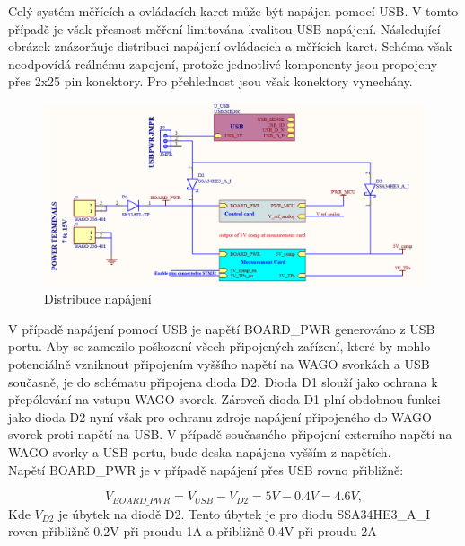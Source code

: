     Celý systém měřících a ovládacích karet může být napájen pomocí USB. V tomto případě je však přesnost
    měření limitována kvalitou USB napájení. Následující obrázek znázorňuje distribuci napájení
    ovládacích a měřících karet. Schéma však neodpovídá reálnému zapojení, protože jednotlivé
    komponenty jsou propojeny přes 2x25 pin konektory. Pro přehlednost jsou však konektory vynechány.
    \clearpage


    \begin{figure}[ht!]
        \centering
        \includegraphics[width = 1\textwidth]{obrazky/USB_power_distr.png}
        \caption{Distribuce napájení}
        \label{fig:Distribuce napájení}
    \end{figure}

    V případě napájení pomocí USB je napětí BOARD\_PWR generováno z USB portu.
    Aby se zamezilo poškození všech připojených zařízení, které by mohlo potenciálně vzniknout připojením
    vyššího napětí na WAGO svorkách a USB současně, je do schématu připojena dioda D2. Dioda D1
    slouží jako ochrana k přepólování na vstupu WAGO svorek. Zároveň dioda D1 plní obdobnou funkci jako dioda D2
    nyní však pro ochranu zdroje napájení připojeného do WAGO svorek proti napětí na USB.
    V případě současného připojení externího napětí na WAGO svorky a USB portu, bude deska napájena
    vyšším z napětích.\\

    Napětí BOARD\_PWR je v případě napájení přes USB rovno přibližně:
    
    \begin{equation}
        V_{BOARD\_PWR} = V_{USB} - V_{D2} = 5V - 0.4V = 4.6V,
    \end{equation}
    Kde $V_{D2}$ je úbytek na diodě D2. Tento úbytek je pro diodu SSA34HE3\_A\_I roven přibližně 0.2V při proudu 1A
    a přibližně 0.4V při proudu 2A\\

